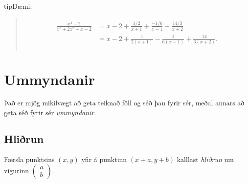 \documentclass[a4paper,10pt,icelandic]{sphinxmanual}
\begin{document}
\begin{sphinxadmonition}{tip}{Dæmi:}
\begin{enumerate}
\end{enumerate}
\begin{quote}
\begin{equation*}
\begin{split}\begin{aligned}
\frac{x^4-2}{x^3+2x^2-x-2}&=x-2+\frac{1/2}{x+1}+\frac{-1/6}{x-1}+\frac{14/3}{x+2} \\
&=x-2+\frac{1}{2(x+1)}-\frac{1}{6(x-1)}+\frac{14}{3(x+2)}.\\
\end{aligned}\end{split}
\end{equation*}\end{quote}
\end{sphinxadmonition}


\section{Ummyndanir}
\label{\detokenize{Kafli09:ummyndanir}}
Það er mjög mikilvægt að geta teiknað föll og séð þau fyrir sér, meðal annars að geta séð fyrir sér \textit{ummyndanir}.


\subsection{Hliðrun}
\label{\detokenize{Kafli09:hlirun}}
Færsla punktsins \((x,y)\) yfir á punktinn \((x+a,y+b)\) kalllast \textit{hliðrun} um vigurinn \(\begin{pmatrix} a \\ b \end{pmatrix}\).
\end{document}
